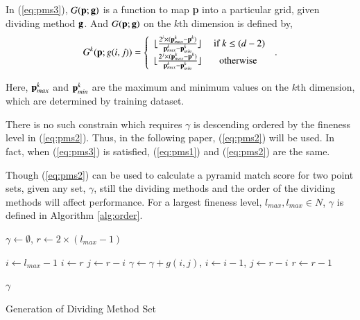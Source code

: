 \documentclass[paper]{ieice}
\begin{document}
In (\ref{eq:pms3}), $G({\bf p};{\bf g})$ is a function to map {\bf p} into a particular grid, given dividing method ${\bf g}$. And $G({\bf p};{\bf g})$ on the $k$th dimension is defined by,
\[
G^k({\bf p};{g(i,j)})=
 \left\{ \begin{array}{*{20}{c}}
    \lfloor { \frac{2^i \times ({\bf p}_{max}^k - {\bf p}^k) }{{\bf p}_{max}^k - {\bf p}_{min}^k} }  \rfloor    &\mbox{  if } k \le (d-2) \\
    \lfloor { \frac{2^j \times ({\bf p}_{max}^k - {\bf p}^k) }{{\bf p}_{max}^k - {\bf p}_{min}^k} }  \rfloor  &\mbox{otherwise}
\end{array} \right. \:.
\]

Here, ${\bf p}_{max}^k$ and ${\bf p}_{min}^k$ are the maximum and minimum values on the $k$th dimension, which are determined by training dataset.



There is no such constrain which requires $\gamma$ is descending ordered by the fineness level in (\ref{eq:pms2}). Thus, in the following paper, (\ref{eq:pms2}) will be used.
In fact, when (\ref{eq:pms3}) is satisfied, (\ref{eq:pms1}) and (\ref{eq:pms2}) are the same.

Though (\ref{eq:pms2}) can be used to calculate a pyramid match score for two point sets, given any set, $\gamma$, still the dividing methods and the order of the dividing methods will affect performance. For a largest fineness level, $l_{max},l_{max}\in N$, $\gamma$ is defined in Algorithm \ref{alg:order}.

\begin{algorithm}





    \begin{algorithmic}[1]


       \STATE $\gamma \leftarrow \emptyset$, $r \leftarrow 2\times (l_{max}-1)$

        \STATE $i \leftarrow l_{max}-1$
        \ELSE
        \STATE $i \leftarrow r$
        \ENDIF
        \STATE $j \leftarrow r-i$
        \STATE $\gamma \leftarrow \gamma + g(i,j)$, $i \leftarrow i-1$, $j \leftarrow r-i$
        \ENDWHILE
        \STATE $r \leftarrow r-1$
        \ENDWHILE




    \RETURN $\gamma$

    \end{algorithmic}
    \caption{Generation of Dividing Method Set}
    \label{alg:order}


\end{algorithm}
\end{document}
